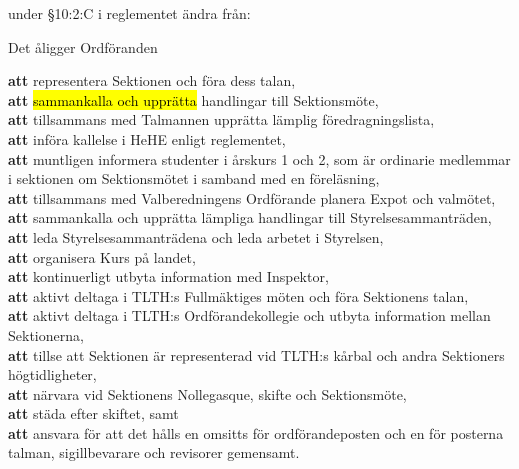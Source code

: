 \documentclass[../_main/handlingar.tex]{subfiles}
\begin{document}
\begin{attsatser}
    \newpage

    \att under \S10:2:C i reglementet ändra från:\par
    \begin{itshape}
    Det åligger Ordföranden\par
    \textbf{att} representera Sektionen och föra dess talan,\\
    \textbf{att} \hl{sammankalla och upprätta} handlingar till Sektionsmöte,\\
    \textbf{att} tillsammans med Talmannen upprätta lämplig föredragningslista,\\
    \textbf{att} införa kallelse i HeHE enligt reglementet,\\
    \textbf{att} muntligen informera studenter i årskurs 1 och 2, som är ordinarie medlemmar i sektionen om Sektionsmötet i samband med en föreläsning,\\
    \textbf{att} tillsammans med Valberedningens Ordförande planera Expot och valmötet,\\
    \textbf{att} sammankalla och upprätta lämpliga handlingar till Styrelsesammanträden,\\
    \textbf{att} leda Styrelsesammanträdena och leda arbetet i Styrelsen,\\
    \textbf{att} organisera Kurs på landet,\\
    \textbf{att} kontinuerligt utbyta information med Inspektor,\\
    \textbf{att} aktivt deltaga i TLTH:s Fullmäktiges möten och föra Sektionens talan,\\
    \textbf{att} aktivt deltaga i TLTH:s Ordförandekollegie och utbyta information mellan Sektionerna,\\
    \textbf{att} tillse att Sektionen är representerad vid TLTH:s kårbal och andra Sektioners högtidligheter,\\
    \textbf{att} närvara vid Sektionens Nollegasque, skifte och Sektionsmöte,\\
    \textbf{att} städa efter skiftet, samt\\
    \textbf{att} ansvara för att det hålls en omsitts för ordförandeposten och en för posterna talman, sigillbevarare och revisorer gemensamt.
    \end{itshape}


\end{attsatser}
\end{document}
